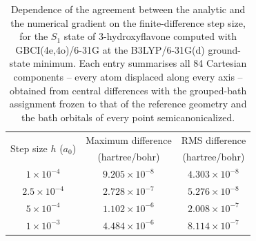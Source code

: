 \begin{table}[htbp]
  \centering
  \caption{
  Dependence of the agreement between the analytic and the numerical
  gradient on the finite-difference step size, for the $S_1$ state of
  3-hydroxyflavone computed with GBCI(4e,4o)/6-31G at the
  B3LYP/6-31G(d) ground-state minimum. Each entry summarises all
  84 Cartesian components -- every atom displaced along every axis --
  obtained from central differences with the grouped-bath assignment
  frozen to that of the reference geometry and the bath orbitals of
  every point semicanonicalized.
  }
  \label{tab:si_3hf_step_size}
  \begin{tabular}{ccc}
    \hline
    \multirow{2}{*}{Step size $h$ ($a_0$)} &
    \multicolumn{1}{c}{Maximum difference} &
    \multicolumn{1}{c}{RMS difference} \\
    & \multicolumn{1}{c}{(hartree/bohr)} & \multicolumn{1}{c}{(hartree/bohr)} \\
    \hline
    $1 \times 10^{-4}$ & $9.205 \times 10^{-8}$ & $4.303 \times 10^{-8}$ \\
    $2.5 \times 10^{-4}$ & $2.728 \times 10^{-7}$ & $5.276 \times 10^{-8}$ \\
    $5 \times 10^{-4}$ & $1.102 \times 10^{-6}$ & $2.008 \times 10^{-7}$ \\
    $1 \times 10^{-3}$ & $4.484 \times 10^{-6}$ & $8.114 \times 10^{-7}$ \\
    \hline
  \end{tabular}
\end{table}
